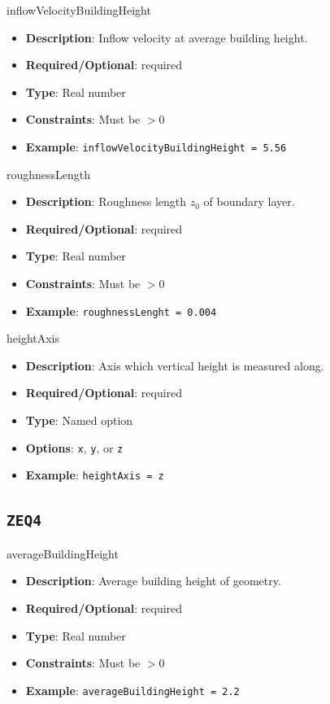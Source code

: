 inflowVelocityBuildingHeight
\vspace{\the\parameterListSpacing}
\begin{itemize}
    \item {\bf Description}: Inflow velocity at average building height.
    \item {\bf Required/Optional}: required
    \item {\bf Type}: Real number
    \item {\bf Constraints}: Must be $>0$
    \item {\bf Example}: \lstinline!inflowVelocityBuildingHeight = 5.56!
\end{itemize}


roughnessLength
\vspace{\the\parameterListSpacing}
\begin{itemize}
    \item {\bf Description}: Roughness length $z_0$ of boundary layer.
    \item {\bf Required/Optional}: required
    \item {\bf Type}: Real number
    \item {\bf Constraints}: Must be $>0$
    \item {\bf Example}: \lstinline!roughnessLenght = 0.004!
\end{itemize}

heightAxis
\vspace{\the\parameterListSpacing}
\begin{itemize}
    \item {\bf Description}: Axis which vertical height is measured along.
    \item {\bf Required/Optional}: required
    \item {\bf Type}: Named option
    \item {\bf Options}: \lstinline!x!, \lstinline!y!, or \lstinline!z!
    \item {\bf Example}: \lstinline!heightAxis = z!
\end{itemize}


\newpage
\subsection*{\lstinline!ZEQ4!}
averageBuildingHeight
\vspace{\the\parameterListSpacing}
\begin{itemize}
    \item {\bf Description}: Average building height of geometry.
    \item {\bf Required/Optional}: required
    \item {\bf Type}: Real number
    \item {\bf Constraints}: Must be $>0$
    \item {\bf Example}: \lstinline!averageBuildingHeight = 2.2!
\end{itemize}


